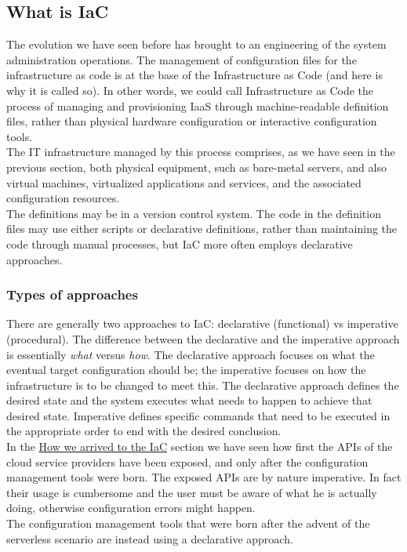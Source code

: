\subsection{What is IaC}
The evolution we have seen before has brought to an engineering of the system administration operations.
The management of configuration files for the infrastructure as code is at the base of the Infrastructure as Code (and here is why it is called so).
In other words, we could call Infrastructure as Code the process of managing and provisioning \gls{IaaS} through machine-readable definition files, rather than physical hardware configuration or interactive configuration tools. \\
The IT infrastructure managed by this process comprises, as we have seen in the previous section, both physical equipment, such as bare-metal servers, and also virtual machines, virtualized applications and services, and the associated configuration resources. \\
The definitions may be in a version control system. The code in the definition files may use either scripts or declarative definitions, rather than maintaining the code through manual processes, but IaC more often employs declarative approaches.


\subsubsection{Types of approaches}

There are generally two approaches to IaC: declarative (functional) vs imperative (procedural). The difference between the declarative and the imperative approach is essentially \textit{what} versus \textit{how}.
The declarative approach focuses on what the eventual target configuration should be; the imperative focuses on how the infrastructure is to be changed to meet this.
The declarative approach defines the desired state and the system executes what needs to happen to achieve that desired state.
Imperative defines specific commands that need to be executed in the appropriate order to end with the desired conclusion.\\
In the \hyperref[sec:story-iac]{How we arrived to the IaC} section we have seen how first the APIs of the cloud service providers have been exposed, and only after the configuration management tools were born.
The exposed APIs are by nature imperative. In fact their usage is cumbersome and the user must be aware of what he is actually doing, otherwise configuration errors might happen.\\
The configuration management tools that were born after the advent of the serverless scenario are instead using a declarative approach.

